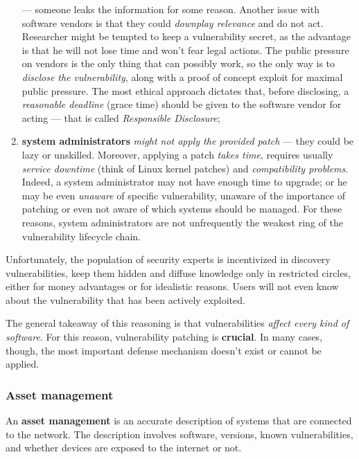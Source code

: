 \documentclass[10pt]{\classname}
\begin{document}
\begin{enumerate}
        --- someone leaks the information for some reason. Another issue with
        software vendors is that they could \emph{downplay relevance} and do
        not act. Researcher might be tempted to keep a vulnerability secret, as
        the advantage is that he will not lose time and won't fear legal
        actions. The public pressure on vendors is the only thing that can possibly
        work, so the only way is to \emph{disclose the vulnerability}, along
        with a proof of concept exploit for maximal public pressure. The most
        ethical approach dictates that, before disclosing, a \emph{reasonable
        deadline} (grace time) should be given to the software vendor for
        acting --- that is called \emph{Responsible Disclosure};
    \item \textbf{system administrators} \emph{might not apply the provided
        patch} --- they could be lazy or unskilled. Moreover, applying a patch
        \emph{takes time}, requires usually \emph{service downtime} (think of
        Linux kernel patches) and \emph{compatibility problems}. Indeed, a
        system administrator may not have enough time to upgrade; or he may be
        even \emph{unaware} of specific vulnerability, unaware of the
        importance of patching or even not aware of which systems should be
        managed. For these reasons, system administrators are not unfrequently
        the weakest ring of the vulnerability lifecycle chain.
\end{enumerate}

Unfortunately, the population of security experts is incentivized in discovery
vulnerabilities, keep them hidden and diffuse knowledge only in restricted
circles, either for money advantages or for idealistic reasons. Users will not
even know about the vulnerability that has been actively exploited.

The general takeaway of this reasoning is that vulnerabilities \emph{affect
every kind of software}. For this reason, vulnerability patching is
\textbf{crucial}. In many cases, though, the most important defense mechanism
doesn't exist or cannot be applied.

\subsubsection{Asset management}

An \textbf{asset management} is an accurate description of systems that are
connected to the network. The description involves software, versions, known
vulnerabilities, and whether devices are exposed to the internet or not.
\end{document}
